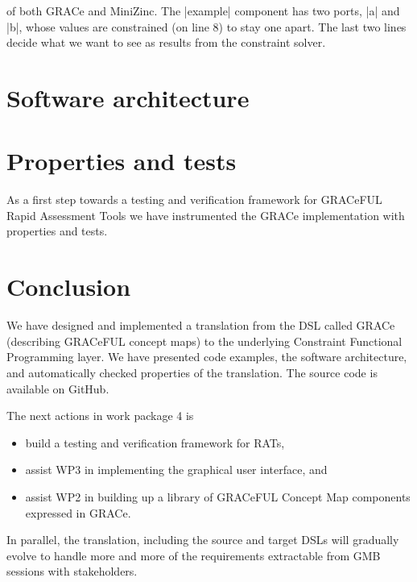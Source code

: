 \documentclass{article}
\begin{document}
of both GRACe and
MiniZinc. The |example| component has two ports, |a| and |b|, whose values are
constrained (on line 8) to stay one apart. The last two lines decide what we
want to see as results from the constraint solver.


\section{Software architecture}
\label{sec:architecture}




\section{Properties and tests}

As a first step towards a testing and verification framework for
GRACeFUL Rapid Assessment Tools we have instrumented the GRACe
implementation with properties and tests.
%


\section{Conclusion}
\label{sec:conclusion}

We have designed and implemented a translation from the DSL called
GRACe (describing GRACeFUL concept maps) to the underlying Constraint
Functional Programming layer.
%
We have presented code examples, the software architecture, and
automatically checked properties of the translation.
%
The source code is available on GitHub.

The next actions in work package 4 is
\begin{itemize}
\item build a testing and verification framework for RATs,
\item assist WP3 in implementing the graphical user interface, and
\item assist WP2 in building up a library of GRACeFUL Concept Map
  components expressed in GRACe.
\end{itemize}
%
In parallel, the translation, including the source and target DSLs
will gradually evolve to handle more and more of the requirements
extractable from GMB sessions with stakeholders.

\appendix





\end{document}
